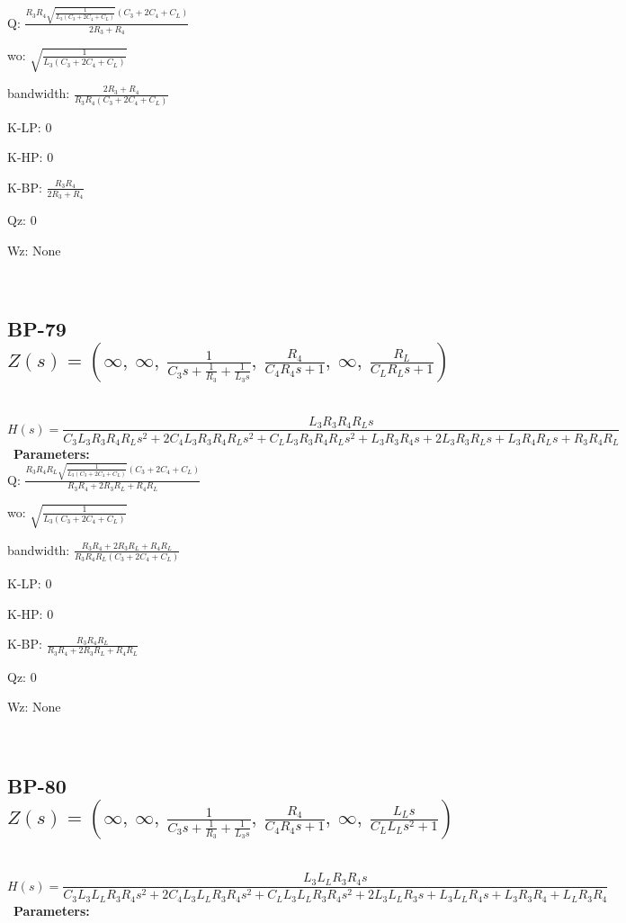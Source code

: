 \documentclass{article}
\begin{document}
Q: $\frac{R_{3} R_{4} \sqrt{\frac{1}{L_{3} \left(C_{3} + 2 C_{4} + C_{L}\right)}} \left(C_{3} + 2 C_{4} + C_{L}\right)}{2 R_{3} + R_{4}}$\ 

wo: $\sqrt{\frac{1}{L_{3} \left(C_{3} + 2 C_{4} + C_{L}\right)}}$\ 

bandwidth: $\frac{2 R_{3} + R_{4}}{R_{3} R_{4} \left(C_{3} + 2 C_{4} + C_{L}\right)}$\ 

K-LP: $0$\ 

K-HP: $0$\ 

K-BP: $\frac{R_{3} R_{4}}{2 R_{3} + R_{4}}$\ 

Qz: $0$\ 

Wz: $\text{None}$\ 

\ 

\subsection{BP-79 $Z(s) = \left( \infty, \  \infty, \  \frac{1}{C_{3} s + \frac{1}{R_{3}} + \frac{1}{L_{3} s}}, \  \frac{R_{4}}{C_{4} R_{4} s + 1}, \  \infty, \  \frac{R_{L}}{C_{L} R_{L} s + 1}\right)$ } \ 
\textbf{\[H(s) = \frac{L_{3} R_{3} R_{4} R_{L} s}{C_{3} L_{3} R_{3} R_{4} R_{L} s^{2} + 2 C_{4} L_{3} R_{3} R_{4} R_{L} s^{2} + C_{L} L_{3} R_{3} R_{4} R_{L} s^{2} + L_{3} R_{3} R_{4} s + 2 L_{3} R_{3} R_{L} s + L_{3} R_{4} R_{L} s + R_{3} R_{4} R_{L}}\] } \ 
\textbf{Parameters:}\\ 

Q: $\frac{R_{3} R_{4} R_{L} \sqrt{\frac{1}{L_{3} \left(C_{3} + 2 C_{4} + C_{L}\right)}} \left(C_{3} + 2 C_{4} + C_{L}\right)}{R_{3} R_{4} + 2 R_{3} R_{L} + R_{4} R_{L}}$\ 

wo: $\sqrt{\frac{1}{L_{3} \left(C_{3} + 2 C_{4} + C_{L}\right)}}$\ 

bandwidth: $\frac{R_{3} R_{4} + 2 R_{3} R_{L} + R_{4} R_{L}}{R_{3} R_{4} R_{L} \left(C_{3} + 2 C_{4} + C_{L}\right)}$\ 

K-LP: $0$\ 

K-HP: $0$\ 

K-BP: $\frac{R_{3} R_{4} R_{L}}{R_{3} R_{4} + 2 R_{3} R_{L} + R_{4} R_{L}}$\ 

Qz: $0$\ 

Wz: $\text{None}$\ 

\ 

\subsection{BP-80 $Z(s) = \left( \infty, \  \infty, \  \frac{1}{C_{3} s + \frac{1}{R_{3}} + \frac{1}{L_{3} s}}, \  \frac{R_{4}}{C_{4} R_{4} s + 1}, \  \infty, \  \frac{L_{L} s}{C_{L} L_{L} s^{2} + 1}\right)$ } \ 
\textbf{\[H(s) = \frac{L_{3} L_{L} R_{3} R_{4} s}{C_{3} L_{3} L_{L} R_{3} R_{4} s^{2} + 2 C_{4} L_{3} L_{L} R_{3} R_{4} s^{2} + C_{L} L_{3} L_{L} R_{3} R_{4} s^{2} + 2 L_{3} L_{L} R_{3} s + L_{3} L_{L} R_{4} s + L_{3} R_{3} R_{4} + L_{L} R_{3} R_{4}}\] } \ 
\textbf{Parameters:}\\ 
\end{document}
